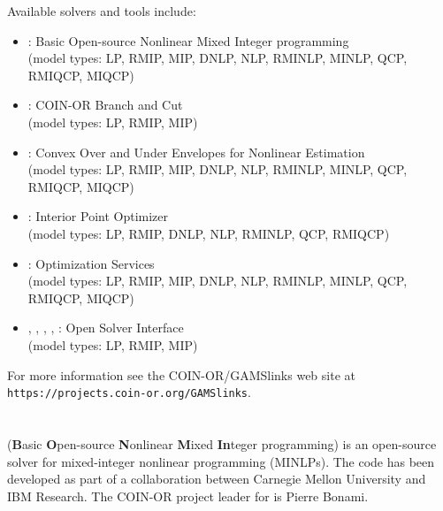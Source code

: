 Available solvers and tools include:
\begin{itemize}
\item \BONMIN: Basic Open-source Nonlinear Mixed Integer programming\\
(model types: LP, RMIP, MIP, DNLP, NLP, RMINLP, MINLP, QCP, RMIQCP, MIQCP)
\item \CBC: COIN-OR Branch and Cut\\
(model types: LP, RMIP, MIP)
\item \COUENNE: Convex Over and Under Envelopes for Nonlinear Estimation\\
(model types: LP, RMIP, MIP, DNLP, NLP, RMINLP, MINLP, QCP, RMIQCP, MIQCP)
\item \IPOPT: Interior Point Optimizer\\
(model types: LP, RMIP, DNLP, NLP, RMINLP, QCP, RMIQCP)
\item \OS: Optimization Services\\
(model types: LP, RMIP, MIP, DNLP, NLP, RMINLP, MINLP, QCP, RMIQCP, MIQCP)
\item \OSICPLEX, \OSIGLPK, \OSIGUROBI, \OSIMOSEK, \OSIXPRESS: Open Solver Interface\\
(model types: LP, RMIP, MIP)
\end{itemize}

For more information see the COIN-OR/GAMSlinks web site at
\texttt{https://projects.coin-or.org/GAMSlinks}.

\section{\BONMIN}


\BONMIN (\textbf{B}asic \textbf{O}pen-source \textbf{N}onlinear \textbf{M}ixed \textbf{In}teger programming) is an open-source solver for mixed-integer nonlinear programming (MINLPs).
The code has been developed as part of a collaboration between Carnegie Mellon University and IBM Research.
The COIN-OR project leader for \BONMIN is Pierre Bonami.

